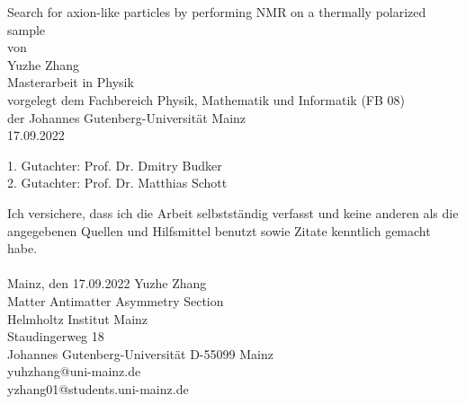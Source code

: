 \documentclass[a4paper,11pt,oneside,final,english,pdftex]{scrbook}
\theoremstyle{plain}
\renewcommand{\figurename}{Fig.}
\begin{document}

\begin{titlepage}
  \vspace*{6mm}
  \begin{center}
     {\afont Search for axion-like particles by performing NMR on a thermally polarized sample}
     \\[3.5cm]
     {\large von}
     \\[3.5cm]
     {\dfont Yuzhe Zhang}
     \\[2cm]
     {\large Masterarbeit in Physik \\
        vorgelegt dem Fachbereich Physik, Mathematik und Informatik (FB 08) \\
        der Johannes Gutenberg-Universit\"at Mainz \\
        17.09.2022}
   \end{center}
   1. Gutachter: Prof. Dr. Dmitry Budker\\
   2. Gutachter: Prof. Dr. Matthias Schott\\
\end{titlepage}

\thispagestyle{empty}
Ich versichere, dass ich die Arbeit selbstst\"andig verfasst und keine 
anderen als die angegebenen Quellen und Hilfsmittel benutzt sowie 
Zitate kenntlich gemacht habe.
\\
\\[3.5cm] 
Mainz, den 17.09.2022 
\vfill
\noindent 
Yuzhe Zhang\\
Matter Antimatter Asymmetry Section\\
Helmholtz Institut Mainz\\
Staudingerweg 18\\
Johannes Gutenberg-Universit\"at
D-55099 Mainz\\
{\ttfamily yuhzhang@uni-mainz.de}\\
{\ttfamily yzhang01@students.uni-mainz.de}
\renewcommand\figurename{Figure}
\renewcommand\tablename{Table}
\tableofcontents
\clearpage

\mainmatter
\sloppy

\listoffigures
\listoftables







\backmatter
% 
%


% 
% 
\printbibliography
\end{document}
